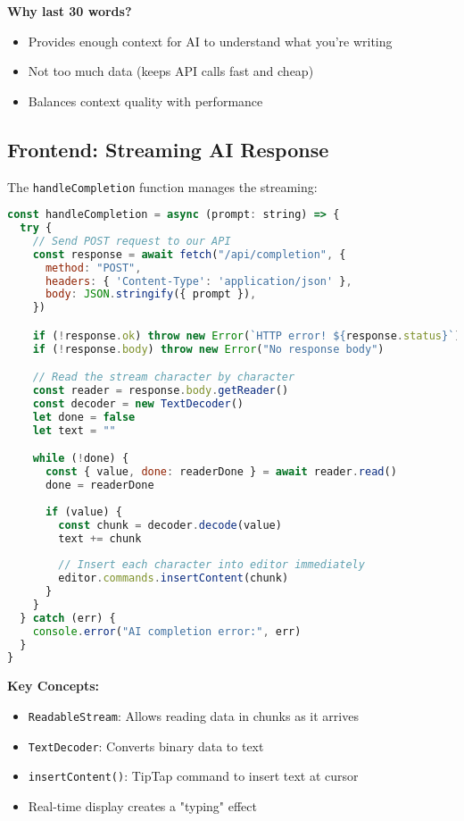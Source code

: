 \documentclass[11pt,a4paper]{article}
\begin{document}
\textbf{Why last 30 words?}
\begin{itemize}
    \item Provides enough context for AI to understand what you're writing
    \item Not too much data (keeps API calls fast and cheap)
    \item Balances context quality with performance
\end{itemize}


\subsection{Frontend: Streaming AI Response}

The \texttt{handleCompletion} function manages the streaming:

\begin{lstlisting}[language=JavaScript]
const handleCompletion = async (prompt: string) => {
  try {
    // Send POST request to our API
    const response = await fetch("/api/completion", {
      method: "POST",
      headers: { 'Content-Type': 'application/json' },
      body: JSON.stringify({ prompt }),
    })

    if (!response.ok) throw new Error(`HTTP error! ${response.status}`)
    if (!response.body) throw new Error("No response body")

    // Read the stream character by character
    const reader = response.body.getReader()
    const decoder = new TextDecoder()
    let done = false
    let text = ""

    while (!done) {
      const { value, done: readerDone } = await reader.read()
      done = readerDone
      
      if (value) {
        const chunk = decoder.decode(value)
        text += chunk
        
        // Insert each character into editor immediately
        editor.commands.insertContent(chunk)
      }
    }
  } catch (err) {
    console.error("AI completion error:", err)
  }
}
\end{lstlisting}

\textbf{Key Concepts:}
\begin{itemize}
    \item \texttt{ReadableStream}: Allows reading data in chunks as it arrives
    \item \texttt{TextDecoder}: Converts binary data to text
    \item \texttt{insertContent()}: TipTap command to insert text at cursor
    \item Real-time display creates a "typing" effect
\end{itemize}
\end{document}
